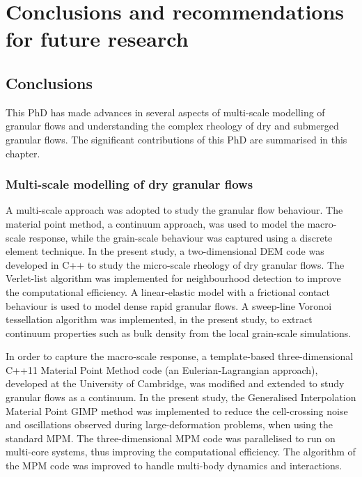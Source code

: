 \chapter{Conclusions and recommendations for future research}

\ifpdf
    \graphicspath{{Chapter7/figs/raster/}{Chapter7/figs/pdf/}{Chapter7/figs/}}
\else
    \graphicspath{{Chapter7/figs/vector/}{Chapter7/figs/}}
\fi
\section{Conclusions}

This PhD has made advances in several aspects of multi-scale modelling of 
granular flows and understanding the complex rheology of dry and submerged 
granular flows. The significant contributions of this PhD are summarised in 
this chapter.

\subsection{Multi-scale modelling of dry granular flows}

A multi-scale approach was adopted to study the granular flow behaviour. The 
material point method, a continuum approach, was used to model the macro-scale 
response, while the grain-scale behaviour was captured using a discrete element 
technique. In the present study, a two-dimensional DEM code was developed in 
C++ to study the micro-scale rheology of dry granular flows. The Verlet-list 
algorithm was implemented for neighbourhood detection to improve the 
computational efficiency. A linear-elastic model with a frictional contact 
behaviour is used to model dense rapid granular flows. A sweep-line Voronoi 
tessellation algorithm was implemented, in the present study, to extract 
continuum properties such as bulk density from the local grain-scale 
simulations.

In order to capture the macro-scale response, a template-based 
three-dimensional C++11 Material Point Method code (an Eulerian-Lagrangian 
approach), developed at the University of Cambridge, was modified and extended 
to study granular flows as a continuum. In the present study, the Generalised 
Interpolation Material Point GIMP method was implemented to reduce the 
cell-crossing noise and oscillations observed during large-deformation 
problems, when using the standard MPM. The three-dimensional MPM code was 
parallelised to run on multi-core systems, thus improving the computational 
efficiency. The algorithm of the MPM code was improved to handle multi-body 
dynamics and interactions.


